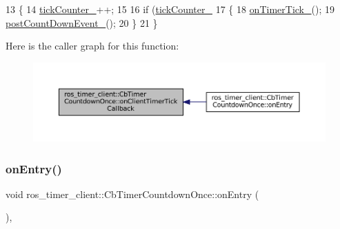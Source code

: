 \begin{DoxyCode}
13 \{
14     \hyperlink{classros__timer__client_1_1CbTimerCountdownOnce_a54fbda19dd432efc2a06014bbc88528c}{tickCounter\_}++;
15 
16     \textcolor{keywordflow}{if} (\hyperlink{classros__timer__client_1_1CbTimerCountdownOnce_a54fbda19dd432efc2a06014bbc88528c}{tickCounter\_} %
17     \{
18         \hyperlink{classros__timer__client_1_1CbTimerCountdownOnce_a9443c6372da3a1faa917d0e9ae7ebd90}{onTimerTick\_}();
19         \hyperlink{classros__timer__client_1_1CbTimerCountdownOnce_a57712ed15f37200e03a15d0c2e3d05fd}{postCountDownEvent\_}();
20     \}
21 \}
\end{DoxyCode}
Here is the caller graph for this function\+:
\nopagebreak
\begin{figure}[H]
\begin{center}
\leavevmode
\includegraphics[width=350pt]{classros__timer__client_1_1CbTimerCountdownOnce_afe103d54afa6b6e7b89fc65447b69523_icgraph}
\end{center}
\end{figure}
\mbox{\label{classros__timer__client_1_1CbTimerCountdownOnce_a06e15530538aed6ff5b55e75fe979907}} 
\subsubsection{\texorpdfstring{on\+Entry()}{onEntry()}}
{\footnotesize\ttfamily void ros\+\_\+timer\+\_\+client\+::\+Cb\+Timer\+Countdown\+Once\+::on\+Entry (\begin{DoxyParamCaption}{ }\end{DoxyParamCaption})\hspace{0.3cm}{\ttfamily [override]}, {\ttfamily [virtual]}}



